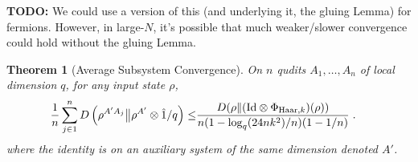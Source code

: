 \documentclass[11pt,reqno]{amsart}
\newtheorem{theorem}[lemma]{Theorem}
\newcommand{\id}{\hat{1}}
\newcommand{\Id}{\mathrm{Id}}
\newcommand{\pl}{\hspace{.1cm}}
\newcommand{\todo}[1]{{\color{red}\textbf{TODO:} #1}}
\begin{document}
\todo{We could use a version of this (and underlying it, the gluing Lemma) for fermions. However, in large-$N$, it's possible that much weaker/slower convergence could hold without the gluing Lemma.}
\begin{theorem}[Average Subsystem Convergence] \label{prop:avg}
    On $n$ qudits $A_1, \dots, A_n$ of local dimension $q$, for any input state $\rho$,
    \begin{equation*}
    \begin{split}
        \frac{1}{n} \sum_{j \in 1}^n D \left (\rho^{A' A_j} \big \| \rho^{A'} \otimes \id / q \right)
        \leq & \frac{D(\rho \| (\Id \otimes \Phi_{\mathrm{Haar},k})(\rho))}{n (1 - \log_q (24 n k^2) / n)(1 - 1/n)} \pl.
    \end{split}
    \end{equation*}
    where the identity is on an auxiliary system of the same dimension denoted $A'$.
\end{theorem}
\end{document}

